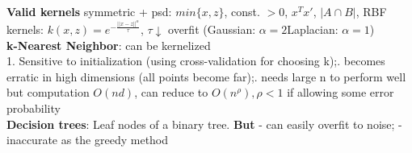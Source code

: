 \textbf{Valid kernels} symmetric + psd: 
$min\{x, z\}$, 
const. $> 0$,  
$x^Tx'$, 
$|A \cap B|$, 
RBF kernels: $k(x, z) = e^{-\frac{||x-z||^{\alpha}}{\tau}}$, $\tau \downarrow$ overfit
(Gaussian: $\alpha = 2$\quad Laplacian: $\alpha = 1$)\\
\textbf{k-Nearest Neighbor}: can be kernelized\\
1. Sensitive to initialization (using cross-validation for choosing k);. becomes erratic in high dimensions (all points become far);. needs large n to perform well but computation $O(nd)$, can reduce to $O(n^{\rho}), \rho < 1$ if allowing some error probability\\
\textbf{Decision trees}:
Leaf nodes of a binary tree. \textbf{But}
- can easily overfit to noise; - inaccurate as the greedy method








